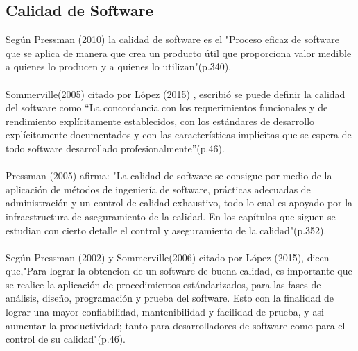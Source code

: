\documentclass[preprint,12pt]{elsarticle}
\begin{document}
	\subsection{\textbf{Calidad de Software}}
Según Pressman (2010) la calidad de software es el "Proceso eficaz de software que se aplica de manera que crea un producto útil que proporciona valor medible a quienes lo producen y a quienes lo utilizan"(p.340).\cite{referenciatorres1}
\\
\\
Sommerville(2005) citado por López (2015) , escribió se puede definir la calidad del software como “La concordancia con los requerimientos funcionales y de rendimiento explícitamente establecidos, con los estándares de desarrollo explícitamente documentados y con las características implícitas que se espera de todo software desarrollado profesionalmente”(p.46).\cite{referenciatorres2}
\\
\\
Pressman (2005) afirma: "La calidad de software se consigue por medio de la aplicación de métodos de ingeniería de software, prácticas adecuadas de administración y un control de calidad exhaustivo, todo lo cual es apoyado por la infraestructura de aseguramiento de la calidad. En los capítulos que siguen se estudian con cierto detalle el control y aseguramiento de la calidad"(p.352).\cite{referenciatorres1}
\\
\\
Según Pressman (2002) y Sommerville(2006) citado por López (2015), dicen que,"Para lograr la obtencion de un software de buena calidad, es importante que se realice la aplicación de procedimientos estándarizados, para las fases de análisis, diseño, programación y prueba del software. Esto con la finalidad de lograr una mayor confiabilidad, mantenibilidad y facilidad de prueba, y asi aumentar la productividad; tanto para desarrolladores de software como para el control de su calidad"(p.46).\cite{referenciatorres2}
\\


\end{document}
